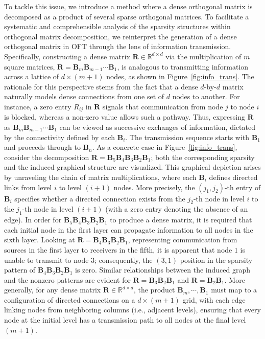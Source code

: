 To tackle this issue, we introduce a method where a dense orthogonal matrix is decomposed as a product of several sparse orthogonal matrices. To facilitate a systematic and comprehensible analysis of the sparsity structures within orthogonal matrix decomposition, we reinterpret the generation of a dense orthogonal matrix in OFT through the lens of information transmission. Specifically, constructing a dense matrix $\bm{R}\in\mathbb{R}^{d\times d}$ via the multiplication of $m$ square matrices, $\bm{R} = \bm{B}_m\bm{B}_{m-1}\cdots\bm{B}_1$, is analogous to transmitting information across a lattice of $d\times (m+1)$ nodes, as shown in Figure~\ref{fig:info_trans}. The rationale for this perspective stems from the fact that a dense $d$-by-$d$ matrix naturally models dense connections from one set of $d$ nodes to another. For instance, a zero entry $R_{ij}$ in $\bm{R}$ signals that communication from node $j$ to node $i$ is blocked, whereas a non-zero value allows such a pathway. Thus, expressing $\bm{R}$ as $\bm{B}_m\bm{B}_{m-1}\cdots\bm{B}_1$ can be viewed as successive exchanges of information, dictated by the connectivity defined by each $\bm{B}_i$. The transmission sequence starts with $\bm{B}_1$ and proceeds through to $\bm{B}_n$. As a concrete case in Figure~\ref{fig:info_trans}, consider the decomposition $\bm{R} = \bm{B}_5\bm{B}_4\bm{B}_3\bm{B}_2\bm{B}_1$; both the corresponding sparsity and the induced graphical structure are visualized. This graphical depiction arises by unraveling the chain of matrix multiplications, where each $\bm{B}_i$ defines directed links from level $i$ to level $(i+1)$ nodes. More precisely, the $(j_1,j_2)$-th entry of $\bm{B}_i$ specifies whether a directed connection exists from the $j_2$-th node in level $i$ to the $j_1$-th node in level $(i+1)$ (with a zero entry denoting the absence of an edge). In order for $\bm{B}_5\bm{B}_4\bm{B}_3\bm{B}_2\bm{B}_1$ to produce a dense matrix, it is required that each initial node in the first layer can propagate information to all nodes in the sixth layer. Looking at $\bm{R} = \bm{B}_4\bm{B}_3\bm{B}_2\bm{B}_1$, representing communication from sources in the first layer to receivers in the fifth, it is apparent that node $1$ is unable to transmit to node $3$; consequently, the $(3,1)$ position in the sparsity pattern of $\bm{B}_4\bm{B}_3\bm{B}_2\bm{B}_1$ is zero. Similar relationships between the induced graph and the nonzero patterns are evident for $\bm{R} = \bm{B}_3\bm{B}_2\bm{B}_1$ and $\bm{R} = \bm{B}_2\bm{B}_1$. More generally, for any dense matrix $\bm{R}\in\mathbb{R}^{d\times d}$, the product $\bm{B}_m,\cdots,\bm{B}_1$ must map to a configuration of directed connections on a $d\times (m+1)$ grid, with each edge linking nodes from neighboring columns (i.e., adjacent levels), ensuring that every node at the initial level has a transmission path to all nodes at the final level $(m+1)$.

